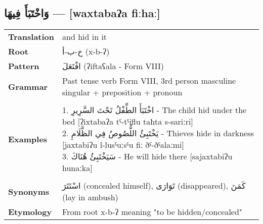 \documentclass[letter,12pt]{article}
\begin{document}
\subsection{\textarabic{وَاخْتَبَأَ فِيهَا} — [waxtabaʔa fiːhaː]}
\begin{tabular}{p{3cm}p{10cm}}
\toprule
\textbf{Translation} & and hid in it \\
\textbf{Root} & \textarabic{خ-ب-أ} (x-b-ʔ) \\
\textbf{Pattern} & \textarabic{افْتَعَلَ} (ʔiftaʕala - Form VIII) \\
\textbf{Grammar} & Past tense verb Form VIII, 3rd person masculine singular + preposition + pronoun \\
\midrule \\
\textbf{Examples} & \makecell[l]{\parbox{9.5cm}{
1. \textarabic{اخْتَبَأَ الطِّفْلُ تَحْتَ السَّرِيرِ} - The child hid under the bed [ʔixtabaʔa tˤ-tˤiflu taħta s-sariːri]\\
2. \textarabic{يَخْتَبِئُ اللُّصُوصُ فِي الظَّلَامِ} - Thieves hide in darkness [jaxtabiʔu l-lusˤuːsˤu fiː ðˤ-ðˤalaːmi]\\
3. \textarabic{سَيَخْتَبِئُ هُنَاكَ} - He will hide there [sajaxtabiʔu hunaːka]
}} \\
\midrule \\
\textbf{Synonyms} & \textarabic{اسْتَتَرَ} (concealed himself), \textarabic{تَوَارَى} (disappeared), \textarabic{كَمَنَ} (lay in ambush) \\
\textbf{Etymology} & From root x-b-ʔ meaning "to be hidden/concealed" \\
\bottomrule
\end{tabular}
\end{document}
